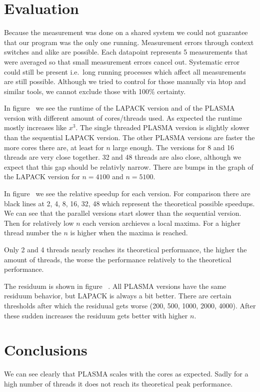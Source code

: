 \documentclass[a4paper,final,ngerman,english]{article}
\begin{document}
\section{Evaluation}
Because the measurement was done on a shared system
we could not guarantee that our program was the only one running.
Measurement errors through context switches and alike are possible.
Each datapoint represents 5 measurements that were averaged so that small measurement errors cancel out.
Systematic error could still be present i.e.\ long running processes which affect all measurements
are still possible. Although we tried to control for those manually via htop and similar tools, we cannot exclude
those with 100\% certainty.

In figure~%
we see the runtime of the LAPACK version and of the PLASMA version with different amount of cores/threads used.
As expected the runtime mostly increases like \(x^3\).
The single threaded PLASMA version is slightly slower than the sequential LAPACK version.
The other PLASMA versions are faster the more cores there are, at least for $n$ large enough.
The versions for 8 and 16 threads are very close together. 32 and 48 threads are also close, although
we expect that this gap should be relativly narrow.
There are bumps in the graph of the LAPACK version for \(n = 4100\) and \(n = 5100 \).

In figure~%
we see the relative speedup for each version.
For comparison there are black lines at 2, 4, 8, 16, 32, 48 which represent the theoretical possible speedups.
We can see that the parallel versions start slower than the sequential version.
Then for relatively low $n$ each version archieves a local maxima.
For a higher thread number the $n$ is higher when the maxima is reached. 

Only 2 and 4 threads nearly reaches its theoretical performance, the higher the amount of threads,
the worse the performance relatively to the theoretical performance.

The residuum is shown in figure~%
. All PLASMA versions have the same residuum behavior, but LAPACK is always a bit better.  
There are certain thresholds after which the residuual gets worse (200, 500, 1000, 2000, 4000).
After these sudden increases the residuum gets better with higher $n$.

\section{Conclusions}
We can see clearly that PLASMA scales with the cores as expected.
Sadly for a high number of threads it does not reach its theoretical peak performance.

%  
\begin{footnotesize}
\end{footnotesize}
\end{document}
